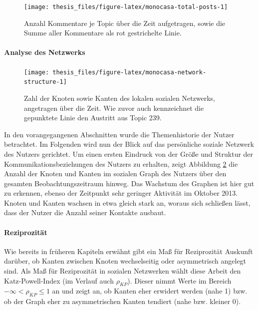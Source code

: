 \documentclass[11pt,a4paper,twoside]{article}
\let\oldpar\paragraph
\renewcommand{\paragraph}{\oldpar*}
\begin{document}
\begin{figure}

{\centering \texttt{[image: thesis\_files/figure-latex/monocasa-total-posts-1]} 

}

\caption{Anzahl Kommentare je Topic über die Zeit
aufgetragen, sowie die Summe aller Kommentare als rot gestrichelte
Linie.}\label{fig:monocasa-total-posts}
\end{figure}

\hypertarget{analyse-des-netzwerks}{%
\paragraph{Analyse des Netzwerks}\label{analyse-des-netzwerks}}





\begin{figure}

{\centering \texttt{[image: thesis\_files/figure-latex/monocasa-network-structure-1]} 

}

\caption{Zahl der Knoten sowie Kanten des
lokalen sozialen Netzwerks, angetragen über die Zeit. Wie zuvor auch
kennzeichnet die gepunktete Linie den Austritt aus Topic 239.}\label{fig:monocasa-network-structure}
\end{figure}

In den vorangegangenen Abschnitten wurde die Themenhistorie der Nutzer
betrachtet. Im Folgenden wird nun der Blick auf das persönliche soziale
Netzwerk des Nutzers gerichtet. Um einen ersten Eindruck von der Größe
und Struktur der Kommunikationsbeziehungen des Nutzers zu erhalten,
zeigt Abbildung \ref{fig:monocasa-network-structure} die Anzahl der
Knoten und Kanten im sozialen Graph des Nutzers über den gesamten
Beobachtungszeitraum hinweg. Das Wachstum des Graphen ist hier gut zu
erkennen, ebenso der Zeitpunkt sehr geringer Aktivität im Oktober 2013.
Knoten und Kanten wachsen in etwa gleich stark an, woraus sich schließen
lässt, dass der Nutzer die Anzahl seiner Kontakte ausbaut.

\hypertarget{reziprozitat-1}{%
\paragraph{Reziprozität}\label{reziprozitat-1}}

Wie bereits in früheren Kapiteln erwähnt gibt ein Maß für Reziprozität
Auskunft darüber, ob Kanten zwischen Knoten wechselseitig oder
asymmetrisch angelegt sind. Als Maß für Reziprozität in sozialen
Netzwerken wählt diese Arbeit den Katz-Powell-Index (im Verlauf auch
\(\rho_{KP}\)). Dieser nimmt Werte im Bereich
\(-\infty < \rho_{KP} \le 1\) an und zeigt an, ob Kanten eher erwidert
werden (nahe 1) bzw. ob der Graph eher zu asymmetrischen Kanten tendiert
(nahe bzw. kleiner 0).
\end{document}
